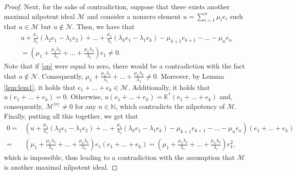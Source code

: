 \documentclass[10pt,a4paper]{amsart}
\begin{document}
\begin{proof}
Next, for the sake of contradiction, suppose that there exists another maximal nilpotent ideal $\mathcal{M}$ and consider a nonzero element $u=\sum_{i=1}^n\mu_ie_i$ such that $u\in\mathcal{M}$ but $u\notin\mathcal{N}$. Then, we have that 
\begin{multline}\label{op}
	u+\frac{\mu_2}{\lambda_1}(\lambda_2e_1-\lambda_1e_2)+\dots+\frac{\mu_k}{\lambda_1}(\lambda_ke_1-\lambda_1e_k)-\mu_{k+1}e_{k+1}-\dots-\mu_ne_n\\=\left(\mu_1+\frac{\mu_2\lambda_2}{\lambda_1}+\dots+\frac{\mu_k\lambda_k}{\lambda_1}\right)e_1\neq0.
\end{multline}
Note that if \eqref{op} were equal to zero, there would be a contradiction with the fact that $u\notin\mathcal{N}$. Consequently, $\mu_1+\frac{\mu_2\lambda_2}{\lambda_1}+\dots+\frac{\mu_k\lambda_k}{\lambda_1}\neq0$. Moreover, by Lemma \ref{lem:lem1}, it holds that $e_1+\dots+e_k\in\mathcal{M}$. Additionally, it holds that $u(e_1+\dots+e_k)=0$. Otherwise, $u(e_1+\dots+e_k)=\mathbb{K}^*(e_1+\dots+e_k)$ and, consequently, $\mathcal{M}^{\langle n\rangle}\neq0$ for any $n\in\mathbb{N}$, which contradicts the nilpotency of $\mathcal{M}$. Finally, putting all this together, we get that 
\begin{align*}
	0=&\left(u+\frac{\mu_2}{\lambda_1}(\lambda_2e_1-\lambda_1e_2)+\dots+\frac{\mu_k}{\lambda_1}(\lambda_ke_1-\lambda_1e_k)-\mu_{k+1}e_{k+1}-\dots-\mu_ne_n\right)(e_1+\dots+e_k)\\=&\left(\mu_1+\frac{\mu_2\lambda_2}{\lambda_1}+\dots+\frac{\mu_k\lambda_k}{\lambda_1}\right)e_1(e_1+\dots+e_k)
	=\left(\mu_1+\frac{\mu_2\lambda_2}{\lambda_1}+\dots+\frac{\mu_k\lambda_k}{\lambda_1}\right)e_1^2,
\end{align*}
which is impossible, thus leading to a contradiction with the assumption that $\mathcal{M}$ is another maximal nilpotent ideal.
\end{proof}
\end{document}
